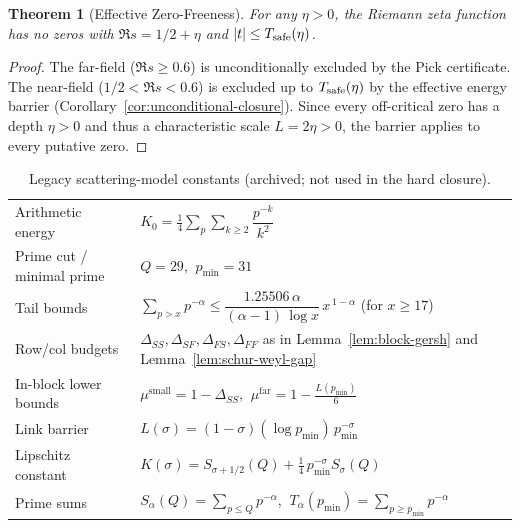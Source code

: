 \documentclass[11pt]{article}
\newtheorem{theorem}{Theorem}
\theoremstyle{definition}
\theoremstyle{remark}
\theoremstyle{definition}
\begin{document}
\begin{theorem}[Effective Zero-Freeness]\label{thm:effective-unconditional}
For any $\eta > 0$, the Riemann zeta function has no zeros with $\Re s = 1/2 + \eta$ and $|t| \le T_{\rm safe}(\eta)$.
\end{theorem}
\begin{proof}
The far-field ($\Re s \ge 0.6$) is unconditionally excluded by the Pick certificate.
The near-field ($1/2 < \Re s < 0.6$) is excluded up to $T_{\rm safe}(\eta)$ by the effective energy barrier (Corollary~\ref{cor:unconditional-closure}).
Since every off-critical zero has a depth $\eta > 0$ and thus a characteristic scale $L = 2\eta > 0$, the barrier applies to every putative zero.
\end{proof}
\begin{table}[H]
\centering
\caption{Legacy scattering-model constants (archived; not used in the hard closure).}
\begin{tabular}{l l}
\toprule
Arithmetic energy & $K_0=\tfrac14\sum_{p}\sum_{k\ge2} \dfrac{p^{-k}}{k^2}$ \\ 
Prime cut / minimal prime & $Q=29$, $\ p_{\min}=31$ \\ 
Tail bounds & $\sum_{p>x}p^{-\alpha} \le \dfrac{1.25506\,\alpha}{(\alpha-1)\,\log x}\,x^{\,1-\alpha}$ (for $x\ge 17$) \\ 
Row/col budgets & $\Delta_{SS},\Delta_{SF},\Delta_{FS},\Delta_{FF}$ as in Lemma~\ref{lem:block-gersh} and Lemma~\ref{lem:schur-weyl-gap} \\ 
In-block lower bounds & $\mu^{\mathrm{small}}=1-\Delta_{SS}$, $\ \mu^{\mathrm{far}}=1-\tfrac{L(p_{\min})}{6}$ \\ 
Link barrier & $L(\sigma)=(1-\sigma)(\log p_{\min})\,p_{\min}^{-\sigma}$ \\ 
Lipschitz constant & $K(\sigma)=S_{\sigma+1/2}(Q)+\tfrac14\,p_{\min}^{-\sigma}S_{\sigma}(Q)$ \\ 
Prime sums & $S_{\alpha}(Q)=\sum_{p\le Q} p^{-\alpha}$, $\ T_{\alpha}(p_{\min})=\sum_{p\ge p_{\min}} p^{-\alpha}$ \\ 
\bottomrule
\end{tabular}
\end{table}
\appendix
\end{document}
